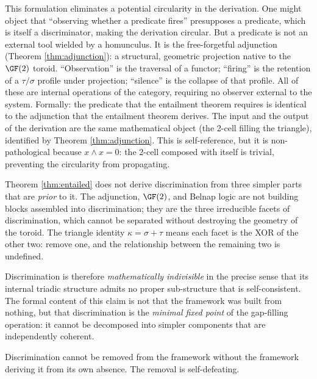 \begin{remark}
This formulation eliminates a potential circularity in the
derivation. One might object that ``observing whether a
predicate fires'' presupposes a predicate, which is itself
a discriminator, making the derivation circular. But a
predicate is not an external tool wielded by a homunculus.
It is the free-forgetful adjunction
(Theorem \ref{thm:adjunction}): a structural, geometric
projection native to the $\GF(2)$ toroid. ``Observation''
is the traversal of a functor; ``firing'' is the
retention of a $\tau/\sigma$ profile under projection;
``silence'' is the collapse of that profile. All of these
are internal operations of the category, requiring no
observer external to the system. Formally: the
predicate that the entailment theorem requires is
identical to the adjunction that the entailment theorem
derives. The input and the output of the derivation are
the same mathematical object (the 2-cell filling the
triangle), identified by Theorem \ref{thm:adjunction}.
This is self-reference, but it is non-pathological because
$x \wedge x = 0$: the 2-cell composed with itself is
trivial, preventing the circularity from propagating.
\end{remark}

\begin{remark}
Theorem \ref{thm:entailed} does not derive discrimination
from three simpler parts that are \emph{prior} to it.
The adjunction, $\GF(2)$, and Belnap logic are not
building blocks assembled into discrimination; they are
the three irreducible facets of discrimination, which
cannot be separated without destroying the geometry of
the toroid. The triangle identity
$\kappa = \sigma + \tau$ means each facet is the XOR of
the other two: remove one, and the relationship between
the remaining two is undefined.

Discrimination is therefore \emph{mathematically
indivisible} in the precise sense that its internal
triadic structure admits no proper sub-structure that is
self-consistent. The formal content of this claim is not
that the framework was built from nothing, but that
discrimination is the \emph{minimal fixed point} of the
gap-filling operation: it cannot be decomposed into
simpler components that are independently coherent.
\end{remark}

\begin{theorem}
\label{thm:irremovable}
Discrimination cannot be removed from the framework without
the framework deriving it from its own absence. The removal
is self-defeating.
\end{theorem}

